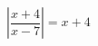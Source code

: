\begin{ex}[type=equation]
	\begin{condition}
		\( \left| \dfrac{x+4}{x-7} \right|=x+4 \)
	\end{condition}
\end{ex}